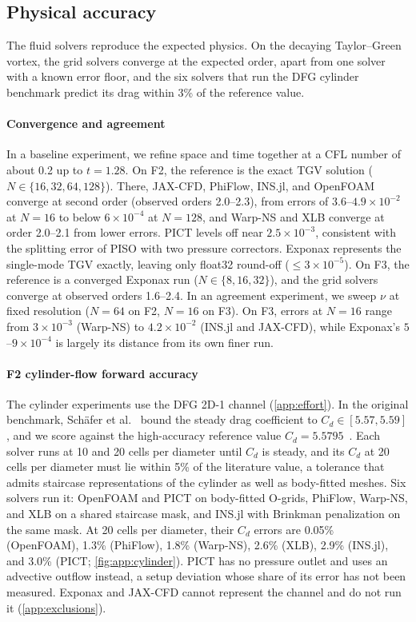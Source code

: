 

\subsection{Physical accuracy}
\label{app:physical_accuracy}

The fluid solvers reproduce the expected physics. On the decaying Taylor--Green
vortex, the grid solvers converge at the expected order, apart from one solver
with a known error floor, and the six solvers that run the DFG cylinder benchmark
predict its drag within 3\% of the reference value.

\paragraph{Convergence and agreement}
In a baseline experiment, we refine space and time together at a CFL number of about
0.2 up to $t=1.28$. On F2, the reference is the exact TGV solution
($N\in\{16,32,64,128\}$). There, JAX-CFD, PhiFlow, INS.jl, and OpenFOAM converge
at second order (observed orders 2.0--2.3), from errors of
$3.6$--$4.9\times10^{-2}$ at $N=16$ to below $6\times10^{-4}$ at $N=128$, and
Warp-NS and XLB converge at order 2.0--2.1 from lower errors. PICT levels off
near $2.5\times10^{-3}$, consistent with the splitting error of PISO with two
pressure correctors. Exponax represents the single-mode TGV exactly, leaving
only float32 round-off ($\leq 3\times10^{-5}$). On F3, the reference is a
converged Exponax run ($N\in\{8,16,32\}$), and the grid solvers converge at
observed orders 1.6--2.4. In an agreement experiment, we sweep $\nu$ at fixed
resolution ($N=64$ on F2, $N=16$ on F3). On F3, errors at $N=16$ range from
$3\times10^{-3}$ (Warp-NS) to $4.2\times10^{-2}$ (INS.jl and JAX-CFD), while
Exponax's $5$--$9\times10^{-4}$ is largely its distance from its own finer run.

\paragraph{F2 cylinder-flow forward accuracy}
The cylinder experiments use the DFG 2D-1 channel (\cref{app:effort}). In the original
benchmark, Sch\"afer et al.~\cite{schafer1996benchmark} bound the steady drag coefficient to $C_d\in[5.57,5.59]$,
and we score against the high-accuracy reference value $C_d=5.5795$~\cite{nabh1998high}.
Each solver runs at 10 and 20 cells per diameter until $C_d$ is steady, and its $C_d$ at
20 cells per diameter must lie within 5\% of the literature value, a tolerance that
admits staircase representations of the cylinder as well as body-fitted meshes.
Six solvers run it: OpenFOAM and PICT on body-fitted O-grids, PhiFlow, Warp-NS, and XLB
on a shared staircase mask, and INS.jl with Brinkman penalization on the same mask.
At 20 cells per diameter, their $C_d$ errors are 0.05\% (OpenFOAM), 1.3\% (PhiFlow),
1.8\% (Warp-NS), 2.6\% (XLB), 2.9\% (INS.jl), and 3.0\% (PICT; \cref{fig:app:cylinder}).
PICT has no pressure outlet and uses an advective outflow instead, a setup
deviation whose share of its error has not been measured.
Exponax and JAX-CFD cannot represent the channel and do not run it (\cref{app:exclusions}).

